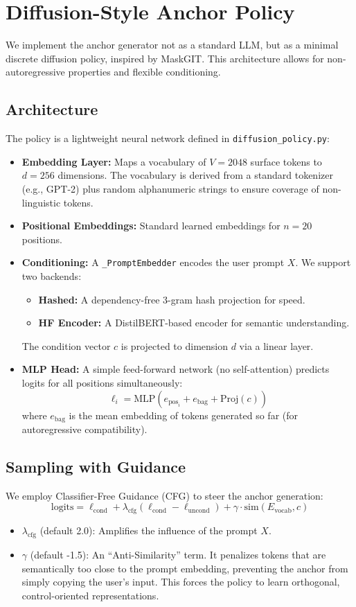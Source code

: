\documentclass[11pt]{article}
\begin{document}
\section{Diffusion-Style Anchor Policy}
We implement the anchor generator not as a standard LLM, but as a minimal discrete diffusion policy, inspired by MaskGIT. This architecture allows for non-autoregressive properties and flexible conditioning.

\subsection{Architecture}
The policy is a lightweight neural network defined in \texttt{diffusion\_policy.py}:
\begin{itemize}
    \item \textbf{Embedding Layer:} Maps a vocabulary of $V=2048$ surface tokens to $d=256$ dimensions. The vocabulary is derived from a standard tokenizer (e.g., GPT-2) plus random alphanumeric strings to ensure coverage of non-linguistic tokens.
    \item \textbf{Positional Embeddings:} Standard learned embeddings for $n=20$ positions.
    \item \textbf{Conditioning:} A \texttt{\_PromptEmbedder} encodes the user prompt $X$. We support two backends:
    \begin{itemize}
        \item \textbf{Hashed:} A dependency-free 3-gram hash projection for speed.
        \item \textbf{HF Encoder:} A DistilBERT-based encoder for semantic understanding.
    \end{itemize}
    The condition vector $c$ is projected to dimension $d$ via a linear layer.
    \item \textbf{MLP Head:} A simple feed-forward network (no self-attention) predicts logits for all positions simultaneously:
    \[ \ell_i = \text{MLP}(e_{\text{pos}_i} + e_{\text{bag}} + \text{Proj}(c)) \]
    where $e_{\text{bag}}$ is the mean embedding of tokens generated so far (for autoregressive compatibility).
\end{itemize}

\subsection{Sampling with Guidance}
We employ Classifier-Free Guidance (CFG) to steer the anchor generation:
\begin{equation}
    \text{logits} = \ell_{\text{cond}} + \lambda_{\text{cfg}} (\ell_{\text{cond}} - \ell_{\text{uncond}}) + \gamma \cdot \text{sim}(E_{\text{vocab}}, c)
\end{equation}
\begin{itemize}
    \item $\lambda_{\text{cfg}}$ (default 2.0): Amplifies the influence of the prompt $X$.
    \item $\gamma$ (default -1.5): An ``Anti-Similarity'' term. It penalizes tokens that are semantically too close to the prompt embedding, preventing the anchor from simply copying the user's input. This forces the policy to learn orthogonal, control-oriented representations.
\end{itemize}
\end{document}
